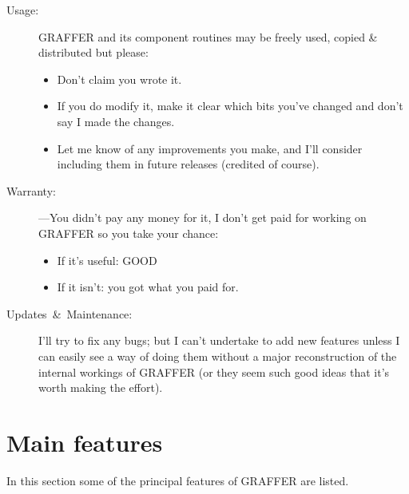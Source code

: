 \documentclass[11pt,twoside,english]{article}
\begin{document}
\begin{description}
\item [Usage:]GRAFFER and its component routines may be freely used,
  copied \& distributed but please:

  \begin{itemize}
  \item Don't claim you wrote it.
  \item If you do modify it, make it clear which bits you've changed
    and don't say I made the changes.
  \item Let me know of any improvements you make, and I'll consider
    including them in future releases (credited of course).
  \end{itemize}
\item [Warranty:]---You didn't pay any money for it, I
  don't get paid for working on GRAFFER so you take your chance:

  \begin{itemize}
  \item If it's useful: GOOD
  \item If it isn't: you got what you paid for.
  \end{itemize}
\item [Updates~\&~Maintenance:]I'll try to fix any bugs; but I can't
  undertake to add new features unless I can easily see a way of doing
  them without a major reconstruction of the internal workings of
  GRAFFER (or they seem such good ideas that it's worth making the
  effort).
\end{description}

\section{Main features}

In this section some of the principal features of GRAFFER are listed.
\end{document}
